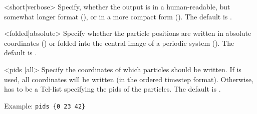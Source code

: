 \begin{arguments}
\item[<short|verbose>] Specify, whether the output is in a
  human-readable, but somewhat longer format (), or
  in a more compact form (). The default is
  .
  
\item[<folded|absolute>] Specify whether the particle positions
  are written in absolute coordinates () or folded
  into the central image of a periodic system (). The
  default is .
  
\item[<pids \var{pids}|all>] Specify the coordinates of which particles
  should be written. If  is used, all coordinates will be
  written (in the ordered timestep format). Otherwise,  has
  to be a Tcl-list specifying the pids of the particles. The default
  is .
  
  Example: \verb!pids {0 23 42}!
  
\end{arguments}


